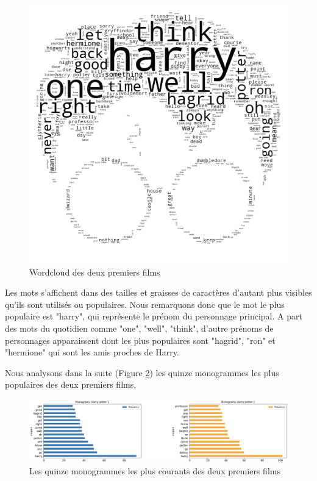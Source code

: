 \documentclass[11pt]{article}
\begin{document}
\begin{center}
\begin{figure}[hbt!]
    \includegraphics[width= 16cm]{./figures/wordcloud.png}
    \caption{Wordcloud des deux premiers films}
    \label{Wordcloud}
\end{figure}
\FloatBarrier

Les mots s'affichent dans des tailles et graisses de caractères d'autant plus visibles qu'ils sont utilisés ou populaires. Nous remarquons donc que le mot le plus populaire est "harry", qui représente le prénom du personnage principal. A part des mots du quotidien comme "one", "well", "think", d'autre prénoms de personnages apparaissent dont les plus populaires sont "hagrid", "ron" et "hermione" qui sont les amis proches de Harry.\par

Nous analysons dans la suite (Figure \ref{monograms}) les quinze monogrammes les plus populaires des deux premiers films.

\begin{figure}[hbt!]
    \centering
    \includegraphics[width= 16cm, height= 7 cm]{./figures/monograms.png}
    \caption{Les quinze monogrammes les plus courants des deux premiers films}
    \label{monograms}
\end{figure}
\FloatBarrier


\end{center}
\end{document}
